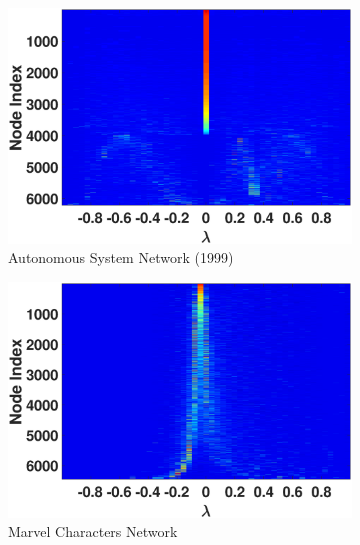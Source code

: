 \begin{figure}[htp]
\begin{subfigure}[t]{0.19\textwidth}
    \includegraphics[width=\textwidth,trim = .4cm 0.5cm 3.5cm 1.3cm,clip]
    {./ndos/pics/as19991115_ldos}
    \caption{Autonomous System Network (1999)}
    \label{fig:as_ldos}
  \end{subfigure}
  \begin{subfigure}[t]{0.19\textwidth}
    \centering  
    \captionsetup{justification=centering,font=scriptsize}
    \includegraphics[width=\textwidth,trim = .4cm 0.5cm 3.5cm 1.3cm,clip]
    {./ndos/pics/marvel_ldos}{}
    \caption{Marvel Characters Network}
    \label{fig:marvel_ldos}
  \end{subfigure}
  \begin{subfigure}[t]{0.19\textwidth}
    \centering  
    \captionsetup{justification=centering,font=scriptsize}

\end{subfigure}
\end{figure}
